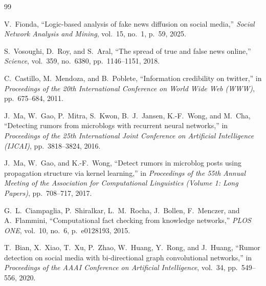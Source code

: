 \documentclass[10pt,twocolumn]{article}
\begin{document}
\begin{thebibliography}{99}

V.~Fionda, ``Logic-based analysis of fake news diffusion on social media,'' \textit{Social Network Analysis and Mining}, vol.~15, no.~1, p.~59, 2025.

S.~Vosoughi, D.~Roy, and S.~Aral, ``The spread of true and false news online,'' \textit{Science}, vol.~359, no.~6380, pp.~1146--1151, 2018.

C.~Castillo, M.~Mendoza, and B.~Poblete, ``Information credibility on twitter,'' in \textit{Proceedings of the 20th International Conference on World Wide Web (WWW)}, pp.~675--684, 2011.

J.~Ma, W.~Gao, P.~Mitra, S.~Kwon, B.~J.~Jansen, K.-F.~Wong, and M.~Cha, ``Detecting rumors from microblogs with recurrent neural networks,'' in \textit{Proceedings of the 25th International Joint Conference on Artificial Intelligence (IJCAI)}, pp.~3818--3824, 2016.

J.~Ma, W.~Gao, and K.-F.~Wong, ``Detect rumors in microblog posts using propagation structure via kernel learning,'' in \textit{Proceedings of the 55th Annual Meeting of the Association for Computational Linguistics (Volume 1: Long Papers)}, pp.~708--717, 2017.

G.~L.~Ciampaglia, P.~Shiralkar, L.~M.~Rocha, J.~Bollen, F.~Menczer, and A.~Flammini, ``Computational fact checking from knowledge networks,'' \textit{PLOS ONE}, vol.~10, no.~6, p.~e0128193, 2015.

T.~Bian, X.~Xiao, T.~Xu, P.~Zhao, W.~Huang, Y.~Rong, and J.~Huang, ``Rumor detection on social media with bi-directional graph convolutional networks,'' in \textit{Proceedings of the AAAI Conference on Artificial Intelligence}, vol.~34, pp.~549--556, 2020.

\end{thebibliography}
\end{document}
